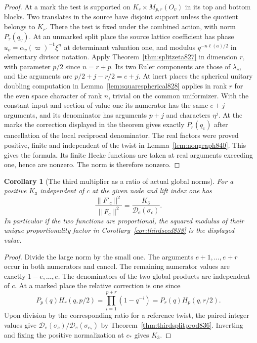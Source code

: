 \documentclass[a4paper,11pt]{article}
\newtheorem{corollary}[proposition]{Corollary}
\theoremstyle{definition}
\theoremstyle{remark}
\numberwithin{equation}{section}
\begin{document}
\begin{proof}
At a mark the test is supported on
\(K_r\times M_{p,r}(O_v)\) in its top and bottom blocks.
Two translates in the source have disjoint support unless
the quotient belongs to \(K_r\). There the test is fixed
under the combined action, with norm \(P_r(q_v)\).
At an unmarked split place the source lattice coefficient
has phase \(u_v=\alpha_v(\varpi)^{-1}\xi^n\) at determinant
valuation one, and modulus \(q^{-n\ell(a)/2}\) in elementary
divisor notation. Apply Theorem~\ref{thm:splitzeta827} in
dimension \(r\), with parameter \(p/2\) since \(n=r+p\).
Its two Euler components are those of \(\lambda_c\), and
the arguments are \(p/2+j-r/2=e+j\). At inert places the
spherical unitary doubling computation in
Lemma~\ref{lem:squarespherical828} applies in rank \(r\)
for the even space character of rank \(n\), trivial on the
common uniformizer. With the constant input and section of
value one its numerator has the same \(e+j\) arguments, and
its denominator has arguments \(p+j\) and characters \(\eta^j\).
At the marks the correction displayed in the theorem gives
exactly \(P_r(q_v)\) after cancellation of the local
reciprocal denominator. The real factors were proved positive,
finite and independent of the twist in
Lemma~\ref{lem:nongraph840}. This gives the formula. Its
finite Hecke functions are taken at real arguments exceeding
one, hence are nonzero. The norm is therefore nonzero.
\end{proof}

\begin{corollary}[The third multiplier as a ratio of actual global norms]
\leavevmode\label{cor:thirdnormratio840}
For a positive \(K_3\) independent of \(c\) at the given
node and lift index one has
\[
              \frac{\|F'_c\|^2}{\|F_c\|^2}
                    =\frac{K_3}{\mathcal D_e(\sigma_c)} .
\]
In particular if the two functions are proportional, the
squared modulus of their unique proportionality factor
in Corollary~\ref{cor:thirdseed838} is the displayed value.
\end{corollary}
\begin{proof}
Divide the large norm by the small one. The arguments
\(e+1,\ldots,e+r\) occur in both numerators and cancel.
The remaining numerator values are exactly \(1-e,\ldots,e\).
The denominators of the two global products are independent
of \(c\). At a marked place the relative correction is one
since
\[
       P_p(q) H_r(q,p/2)
           = \prod_{i=1}^{p+r}(1-q^{-i})
           = P_r(q) H_p(q,r/2).
\]
Upon division by the corresponding ratio for a reference
twist, the paired integer values give
\(\mathcal D_e(\sigma_c)/\mathcal D_e(\sigma_{c_*})\)
by Theorem~\ref{thm:thirdsplitprod836}. Inverting and fixing
the positive normalization at \(c_*\) gives \(K_3\).
\end{proof}
\end{document}
